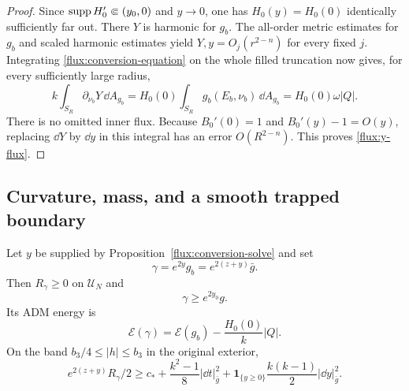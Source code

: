 \begin{proof}
Since $\operatorname{supp} H_0'\Subset(y_0,0)$ and $y\to0$, one has
$H_0(y)=H_0(0)$ identically sufficiently far out.  There $Y$ is harmonic
for $g_b$.  The all-order metric estimates for $g_b$ and scaled harmonic
estimates yield $Y,y=O_j(r^{2-n})$ for every fixed $j$.
Integrating \eqref{flux:conversion-equation} on the whole filled
truncation now gives, for every sufficiently large radius,
\begin{equation}
 k\int_{S_R}\partial_{\nu_b}Y\,\dd A_{g_b}
 =H_0(0)\int_{S_R}g_b(E_b,\nu_b)\,\dd A_{g_b}
 =H_0(0)\omega|Q|.
 \label{flux:Y-flux}
\end{equation}
There is no omitted inner flux.  Because $B_0'(0)=1$ and
$B_0'(y)-1=O(y)$, replacing $\dd Y$ by $\dd y$ in this integral has an
error $O(R^{2-n})$.  This proves \eqref{flux:y-flux}.
\end{proof}

\subsection{Curvature, mass, and a smooth trapped boundary}

\begin{lemma}
\label{flux:uncharged-metric}
Let $y$ be supplied by Proposition~\ref{flux:conversion-solve} and set
\begin{equation}
 \gamma=e^{2y}g_b=e^{2(z+y)}\bar g.
 \label{flux:gamma}
\end{equation}
Then $R_\gamma\geq0$ on $\mathcal U_N$ and
\begin{equation}
 \gamma\geq e^{2y_0}g.
 \label{flux:metric-dominance}
\end{equation}
Its ADM energy is
\begin{equation}
 \mathcal E(\gamma)=\mathcal E(g_b)-\frac{H_0(0)}{k}|Q|.
 \label{flux:mass-decrease}
\end{equation}
On the band $b_3/4\leq|h|\leq b_3$ in the original exterior,
\begin{equation}
 e^{2(z+y)}R_\gamma/2\geq
 c_*+\frac{k^2-1}{8}|\dd t|_{\bar g}^2+
 \mathbf 1_{\{y\geq0\}}\frac{k(k-1)}2|\dd y|_{\bar g}^2.
 \label{flux:gamma-band-curvature}
\end{equation}
\end{lemma}

